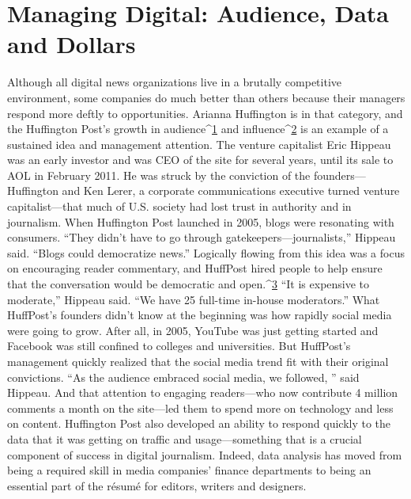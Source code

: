 \chapter{Managing Digital: Audience, Data and Dollars}
Although all digital news organizations live in a brutally competitive environment,
some companies do much better than others because their managers
respond more deftly to opportunities.
Arianna Huffington is in that category, and the Huffington Post's growth in
audience^{\href{#endnotes-chapter-9}{1}} and influence^{\href{#endnotes-chapter-9}{2}} is an example of a sustained idea and management attention.
The venture capitalist Eric Hippeau was an early investor and was CEO
of the site for several years, until its sale to AOL in February 2011. He was struck
by the conviction of the founders—Huffington and Ken Lerer, a corporate communications
executive turned venture capitalist—that much of U.S. society had
lost trust in authority and in journalism. When Huffington Post launched in
2005, blogs were resonating with consumers. ``They didn't have to go through
gatekeepers—journalists,'' Hippeau said. ``Blogs could democratize news.'' Logically
flowing from this idea was a focus on encouraging reader commentary, and
HuffPost hired people to help ensure that the conversation would be democratic
and open.^{\href{#endnotes-chapter-9}{3}} ``It is expensive to moderate,'' Hippeau said. ``We have 25 full-time
in-house moderators.''
What HuffPost's founders didn't know at the beginning was how rapidly social
media were going to grow. After all, in 2005, YouTube was just getting started and
Facebook was still confined to colleges and universities. But HuffPost's management
quickly realized that the social media trend fit with their original convictions.
``As the audience embraced social media, we followed, '' said Hippeau. And
that attention to engaging readers—who now contribute 4 million comments a
month on the site—led them to spend more on technology and less on content.
Huffington Post also developed an ability to respond quickly to the data that it
was getting on traffic and usage—something that is a crucial component of success
in digital journalism. Indeed, data analysis has moved from being a required
skill in media companies' finance departments to being an essential part of the
résumé for editors, writers and designers.

